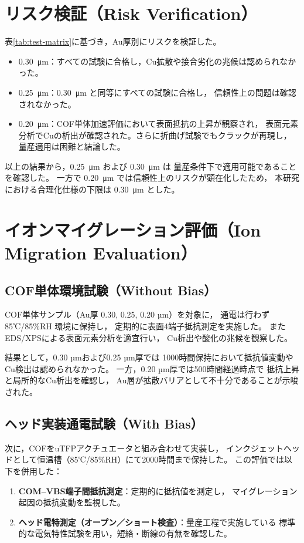 \documentclass[conference]{IEEEtran}
\begin{document}
\section{リスク検証（Risk Verification）}
表\ref{tab:test-matrix}に基づき，Au厚別にリスクを検証した。
\begin{itemize}
  \item \SI{0.30}{\micro\meter}：すべての試験に合格し，Cu拡散や接合劣化の兆候は認められなかった。
  \item \SI{0.25}{\micro\meter}：\SI{0.30}{\micro\meter} と同等にすべての試験に合格し，
        信頼性上の問題は確認されなかった。
  \item \SI{0.20}{\micro\meter}：COF単体加速評価において表面抵抗の上昇が観察され，
        表面元素分析でCuの析出が確認された。さらに折曲げ試験でもクラックが再現し，
        量産適用は困難と結論した。
\end{itemize}

以上の結果から，\SI{0.25}{\micro\meter} および \SI{0.30}{\micro\meter} は
量産条件下で適用可能であることを確認した。  
一方で \SI{0.20}{\micro\meter} では信頼性上のリスクが顕在化したため，
本研究における合理化仕様の下限は \SI{0.30}{\micro\meter} とした。

\section{イオンマイグレーション評価（Ion Migration Evaluation）}

\subsection{COF単体環境試験（Without Bias）}
COF単体サンプル（Au厚 0.30, 0.25, 0.20 µm）を対象に，
通電は行わず 85℃/85\%RH 環境に保持し，
定期的に表面4端子抵抗測定を実施した。
またEDS/XPSによる表面元素分析を適宜行い，
Cu析出や酸化の兆候を観察した。

結果として，0.30 µmおよび0.25 µm厚では
1000時間保持において抵抗値変動やCu検出は認められなかった。
一方，0.20 µm厚では500時間経過時点で
抵抗上昇と局所的なCu析出を確認し，
Au層が拡散バリアとして不十分であることが示唆された。

\subsection{ヘッド実装通電試験（With Bias）}
次に，COFをuTFPアクチュエータと組み合わせて実装し，
インクジェットヘッドとして恒温槽（85℃/85\%RH）にて2000時間まで保持した。  
この評価では以下を併用した：
\begin{enumerate}
  \item \textbf{COM--VBS端子間抵抗測定}：定期的に抵抗値を測定し，
        マイグレーション起因の抵抗変動を監視した。
  \item \textbf{ヘッド電特測定（オープン／ショート検査）}：量産工程で実施している
        標準的な電気特性試験を用い，短絡・断線の有無を確認した。
\end{enumerate}
\end{document}
